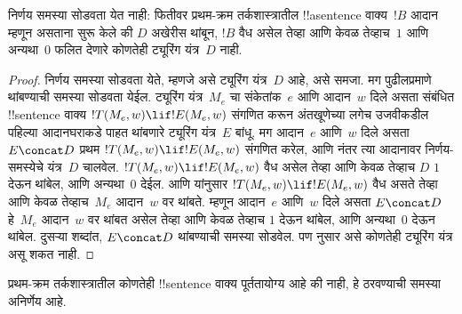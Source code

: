 \documentclass[../../../include/open-logic-section]{subfiles}
\begin{document}

\begin{thm}
निर्णय समस्या सोडवता येत नाही:
फितीवर प्रथम-क्रम तर्कशास्त्रातील
!!a{sentence} वाक्य~$!B$ आदान म्हणून
असताना सुरू केले की $D$ अखेरीस थांबून,
$!B$ वैध असेल तेव्हा आणि केवळ तेव्हाच~$1$ आणि
अन्यथा~$0$ फलित देणारे
कोणतेही ट्यूरिंग यंत्र~$D$ नाही.
\end{thm}

\begin{proof}
निर्णय समस्या सोडवता येते,
म्हणजे असे ट्यूरिंग यंत्र~$D$
आहे, असे समजा. मग पुढीलप्रमाणे
थांबण्याची समस्या सोडवता येईल.
ट्यूरिंग यंत्र~$M_e$ चा संकेतांक~$e$
आणि आदान~$w$ दिले असता
संबंधित !!{sentence} वाक्य
$!T(M_e, w) \lif !E(M_e, w)$
संगणित करून अंतखूणेच्या लगेच उजवीकडील
पहिल्या आदानघराकडे पाहत थांबणारे
ट्यूरिंग यंत्र~$E$ बांधू.
मग आदान~$e$ आणि~$w$
दिले असता $E \concat D$
प्रथम $!T(M_e, w) \lif
!E(M_e, w)$ संगणित करेल,
आणि नंतर त्या आदानावर
निर्णय-समस्येचे यंत्र~$D$
चालवेल. $!T(M_e, w) \lif !E(M_e, w)$
वैध असेल तेव्हा आणि केवळ तेव्हाच $D$
$1$ देऊन थांबेल, आणि
अन्यथा~$0$ देईल.
आणि 
यांनुसार $!T(M_e, w) \lif !E(M_e, w)$
वैध असते तेव्हा आणि केवळ तेव्हाच~$M_e$
आदान~$w$ वर थांबते.
म्हणून आदान~$e$ आणि~$w$
दिले असता $E\concat D$
हे~$M_e$ आदान~$w$
वर थांबत असेल तेव्हा आणि केवळ तेव्हाच
$1$ देऊन थांबेल, आणि
अन्यथा~$0$ देऊन थांबेल.
दुसऱ्या शब्दांत, $E \concat D$
थांबण्याची समस्या सोडवेल.
पण 
नुसार असे कोणतेही
ट्यूरिंग यंत्र असू शकत नाही.
\end{proof}

\begin{cor}%
प्रथम-क्रम तर्कशास्त्रातील
कोणतेही !!{sentence} वाक्य
पूर्ततायोग्य आहे की नाही,
हे ठरवण्याची समस्या अनिर्णेय आहे.
\end{cor}
\end{document}
